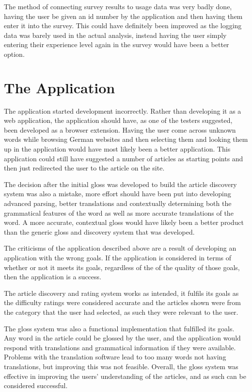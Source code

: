 The method of connecting survey results to usage data was very badly done, having the user be given an id number by the application and then having them enter it into the survey. This could have definitely been improved as the logging data was barely used in the actual analysis, instead having the user simply entering their experience level again in the survey would have been a better option. 

\section{The Application}

The application started development incorrectly. Rather than developing it as a web application, the application should have, as one of the testers suggested, been developed as a browser extension. Having the user come across unknown words while browsing German websites and then selecting them and looking them up in the application would have most likely been a better application. This application could still have suggested a number of articles as starting points and then just redirected the user to the article on the site. 

The decision after the initial gloss was developed to build the article discovery system was also a mistake, more effort should have been put into developing advanced parsing, better translations and contextually determining both the grammatical features of the word as well as more accurate translations of the word. A more accurate, contextual gloss would have likely been a better product than the generic gloss and discovery system that was developed.

The criticisms of the application described above are a result of developing an application with the wrong goals. If the application is considered in terms of whether or not it meets its goals, regardless of the of the quality of those goals, then the application is a success.

The article discovery and rating system works as intended, it fulfils its goals as the difficulty ratings were considered accurate and the articles shown were from the category that the user had selected, as such they were relevant to the user.  

The gloss system was also a functional implementation that fulfilled its goals. Any word in the article could be glossed by the user, and the application would respond with translations and grammatical information if they were available. Problems with the translation software lead to too many words not having translations, but improving this was not feasible. Overall, the gloss system was effective in improving the users' understanding of the articles, and as such can be considered successful.

